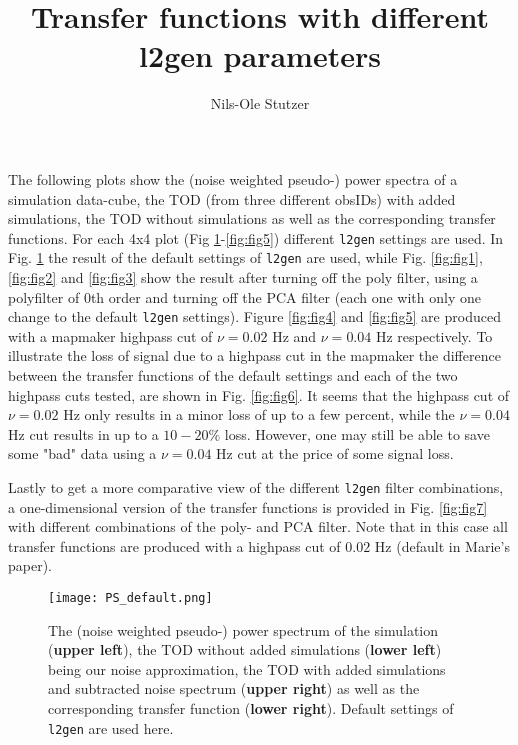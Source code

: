 \documentclass{aastex62}
\begin{document}
\title{Transfer functions with different l2gen parameters}

\author{Nils-Ole Stutzer}
\section*{}
The following plots show the (noise weighted pseudo-) power spectra of a simulation data-cube, the TOD (from three different obsIDs) with added simulations, the TOD without simulations as well as the corresponding transfer functions. For each 4x4 plot (Fig \ref{fig:fig0}-\ref{fig:fig5}) different \texttt{l2gen} settings are used. In Fig. \ref{fig:fig0} the result of the default settings of \texttt{l2gen} are used, while Fig. \ref{fig:fig1}, \ref{fig:fig2} and \ref{fig:fig3} show the result after turning off the poly filter, using a polyfilter of 0th order and turning off the PCA filter (each one with only one change to the default \texttt{l2gen} settings). Figure \ref{fig:fig4} and \ref{fig:fig5} are produced with a mapmaker highpass cut of $\nu = 0.02$ Hz and $\nu = 0.04$ Hz respectively. To illustrate the loss of signal due to a highpass cut in the mapmaker the difference between the transfer functions of the default settings and each of the two highpass cuts tested, are shown in Fig. \ref{fig:fig6}. It seems that the highpass cut of $\nu = 0.02$ Hz only results in a minor loss of up to a few percent, while the $\nu = 0.04$ Hz cut results in up to a $10-20\%$ loss. However, one may still be able to save some "bad" data using a $\nu = 0.04$ Hz cut at the price of some signal loss. 

Lastly to get a more comparative view of the different \texttt{l2gen} filter combinations, a one-dimensional version of the transfer functions is provided in Fig. \ref{fig:fig7} with different combinations of the poly- and PCA filter. Note that in this case all transfer functions are produced with a highpass cut of $0.02$ Hz (default in Marie's paper).


\begin{figure}
    \texttt{[image: PS\_default.png]}
    \caption{The (noise weighted pseudo-) power spectrum of the simulation (\textbf{upper left}), the TOD without added simulations (\textbf{lower left}) being our noise approximation, the TOD with added simulations and subtracted noise spectrum (\textbf{upper right}) as well as the corresponding transfer function (\textbf{lower right}). Default settings of \texttt{l2gen} are used here.}
    \label{fig:fig0}
\end{figure}
\end{document}

